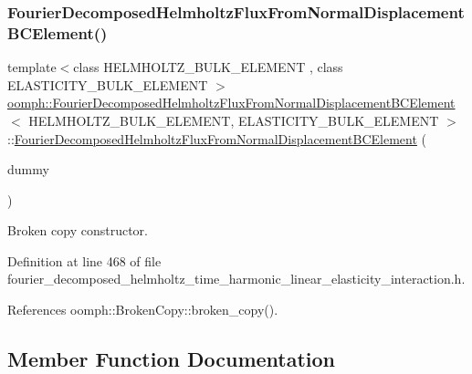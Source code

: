 \subsubsection{\texorpdfstring{Fourier\+Decomposed\+Helmholtz\+Flux\+From\+Normal\+Displacement\+B\+C\+Element()}{FourierDecomposedHelmholtzFluxFromNormalDisplacementBCElement()}\hspace{0.1cm}{\footnotesize\ttfamily [2/2]}}
{\footnotesize\ttfamily template$<$class H\+E\+L\+M\+H\+O\+L\+T\+Z\+\_\+\+B\+U\+L\+K\+\_\+\+E\+L\+E\+M\+E\+NT , class E\+L\+A\+S\+T\+I\+C\+I\+T\+Y\+\_\+\+B\+U\+L\+K\+\_\+\+E\+L\+E\+M\+E\+NT $>$ \\
\hyperlink{classoomph_1_1FourierDecomposedHelmholtzFluxFromNormalDisplacementBCElement}{oomph\+::\+Fourier\+Decomposed\+Helmholtz\+Flux\+From\+Normal\+Displacement\+B\+C\+Element}$<$ H\+E\+L\+M\+H\+O\+L\+T\+Z\+\_\+\+B\+U\+L\+K\+\_\+\+E\+L\+E\+M\+E\+NT, E\+L\+A\+S\+T\+I\+C\+I\+T\+Y\+\_\+\+B\+U\+L\+K\+\_\+\+E\+L\+E\+M\+E\+NT $>$\+::\hyperlink{classoomph_1_1FourierDecomposedHelmholtzFluxFromNormalDisplacementBCElement}{Fourier\+Decomposed\+Helmholtz\+Flux\+From\+Normal\+Displacement\+B\+C\+Element} (\begin{DoxyParamCaption}\item[{const \hyperlink{classoomph_1_1FourierDecomposedHelmholtzFluxFromNormalDisplacementBCElement}{Fourier\+Decomposed\+Helmholtz\+Flux\+From\+Normal\+Displacement\+B\+C\+Element}$<$ H\+E\+L\+M\+H\+O\+L\+T\+Z\+\_\+\+B\+U\+L\+K\+\_\+\+E\+L\+E\+M\+E\+NT, E\+L\+A\+S\+T\+I\+C\+I\+T\+Y\+\_\+\+B\+U\+L\+K\+\_\+\+E\+L\+E\+M\+E\+NT $>$ \&}]{dummy }\end{DoxyParamCaption})\hspace{0.3cm}{\ttfamily [inline]}}



Broken copy constructor. 



Definition at line 468 of file fourier\+\_\+decomposed\+\_\+helmholtz\+\_\+time\+\_\+harmonic\+\_\+linear\+\_\+elasticity\+\_\+interaction.\+h.



References oomph\+::\+Broken\+Copy\+::broken\+\_\+copy().



\subsection{Member Function Documentation}
\mbox{\label{classoomph_1_1FourierDecomposedHelmholtzFluxFromNormalDisplacementBCElement_a721d81ba5e0e9c8d811303e7a9ce5a8a}} 
